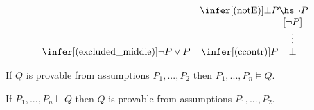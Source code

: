 \documentclass{article}
\begin{document}
\begin{definition}
\begin{align*}
\begin{array}{c c c}
{\begin{array}[b]{c}
            \end{array}} &
            \infer[(\text{notE})]{\bot}{P\hs\neg P} & \\
            \infer[(\text{excluded\_middle})]{\neg P \vee P}{} &
            \infer[\text{(ccontr)}]{P}{\begin{array}[b]{c}
                [\neg P] \\ \vdots \\ \bot
            \end{array}}
        \end{array}
    \end{align*}
\end{definition}

\begin{theorem}[Soundness]
    If $Q$ is provable from assumptions $P_1,...,P_2$ then $P_1,...,P_n\vDash Q$. 
\end{theorem}
\begin{theorem}[Completeness]
    If $P_1,...,P_n\vDash Q$ then $Q$ is provable from assumptions $P_1,...,P_2$. 
\end{theorem}
\end{document}
